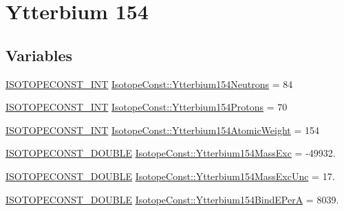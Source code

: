 \hypertarget{group___isotope_const-_ytterbium-_yb154}{}\section{Ytterbium 154}
\label{group___isotope_const-_ytterbium-_yb154}
\subsection*{Variables}
\begin{DoxyCompactItemize}
\item 
\mbox{\hyperlink{group___isotope_const-_macros_ga5f18360b3e99483a35c32d789e62621c}{I\+S\+O\+T\+O\+P\+E\+C\+O\+N\+S\+T\+\_\+\+I\+NT}} \mbox{\hyperlink{group___isotope_const-_ytterbium-_yb154_gab36576b915a27eebeb2fc02718b0e75a}{Isotope\+Const\+::\+Ytterbium154\+Neutrons}} = 84
\item 
\mbox{\hyperlink{group___isotope_const-_macros_ga5f18360b3e99483a35c32d789e62621c}{I\+S\+O\+T\+O\+P\+E\+C\+O\+N\+S\+T\+\_\+\+I\+NT}} \mbox{\hyperlink{group___isotope_const-_ytterbium-_yb154_gabeea8f829a1fb734274b865f09216ad9}{Isotope\+Const\+::\+Ytterbium154\+Protons}} = 70
\item 
\mbox{\hyperlink{group___isotope_const-_macros_ga5f18360b3e99483a35c32d789e62621c}{I\+S\+O\+T\+O\+P\+E\+C\+O\+N\+S\+T\+\_\+\+I\+NT}} \mbox{\hyperlink{group___isotope_const-_ytterbium-_yb154_ga30c0dafbf9de92b1c752584564cdb2eb}{Isotope\+Const\+::\+Ytterbium154\+Atomic\+Weight}} = 154
\item 
\mbox{\hyperlink{group___isotope_const-_macros_ga8f45a7272ce02c0b4c65c44636ed719a}{I\+S\+O\+T\+O\+P\+E\+C\+O\+N\+S\+T\+\_\+\+D\+O\+U\+B\+LE}} \mbox{\hyperlink{group___isotope_const-_ytterbium-_yb154_gaa3eb4b9e39ed3beb7643f61daba66b6a}{Isotope\+Const\+::\+Ytterbium154\+Mass\+Exc}} = -\/49932.
\item 
\mbox{\hyperlink{group___isotope_const-_macros_ga8f45a7272ce02c0b4c65c44636ed719a}{I\+S\+O\+T\+O\+P\+E\+C\+O\+N\+S\+T\+\_\+\+D\+O\+U\+B\+LE}} \mbox{\hyperlink{group___isotope_const-_ytterbium-_yb154_ga5bdbf6af489e2c3e7ee27d463ca9f420}{Isotope\+Const\+::\+Ytterbium154\+Mass\+Exc\+Unc}} = 17.
\item 
\mbox{\hyperlink{group___isotope_const-_macros_ga8f45a7272ce02c0b4c65c44636ed719a}{I\+S\+O\+T\+O\+P\+E\+C\+O\+N\+S\+T\+\_\+\+D\+O\+U\+B\+LE}} \mbox{\hyperlink{group___isotope_const-_ytterbium-_yb154_ga80e63b3a7da035c4fff480553cad4a04}{Isotope\+Const\+::\+Ytterbium154\+Bind\+E\+PerA}} = 8039.
\item 

\end{DoxyCompactItemize}
